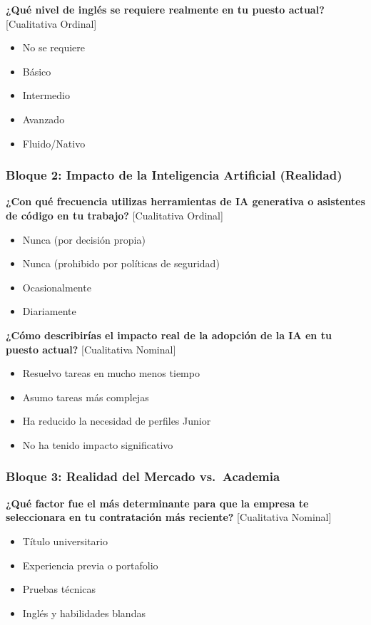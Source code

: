 \textbf{¿Qué nivel de inglés se requiere realmente en tu puesto actual?} [Cualitativa Ordinal]

\begin{itemize}
    \item No se requiere
    \item Básico
    \item Intermedio
    \item Avanzado
    \item Fluido/Nativo
\end{itemize}

\subsubsection*{Bloque 2: Impacto de la Inteligencia Artificial (Realidad)}

\textbf{¿Con qué frecuencia utilizas herramientas de IA generativa o asistentes de código en tu trabajo?} [Cualitativa Ordinal]

\begin{itemize}
    \item Nunca (por decisión propia)
    \item Nunca (prohibido por políticas de seguridad)
    \item Ocasionalmente
    \item Diariamente
\end{itemize}

\textbf{¿Cómo describirías el impacto real de la adopción de la IA en tu puesto actual?} [Cualitativa Nominal]

\begin{itemize}
    \item Resuelvo tareas en mucho menos tiempo
    \item Asumo tareas más complejas
    \item Ha reducido la necesidad de perfiles Junior
    \item No ha tenido impacto significativo
\end{itemize}

\subsubsection*{Bloque 3: Realidad del Mercado vs.~Academia}

\textbf{¿Qué factor fue el más determinante para que la empresa te seleccionara en tu contratación más reciente?} [Cualitativa Nominal]

\begin{itemize}
    \item Título universitario
    \item Experiencia previa o portafolio
    \item Pruebas técnicas
    \item Inglés y habilidades blandas
\end{itemize}

